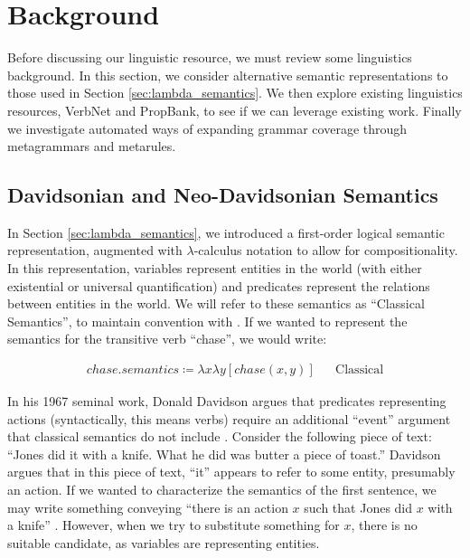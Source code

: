 \documentclass[11pt,a4paper]{article}
\begin{document}

\section{Background}

Before discussing our linguistic resource, we must review some 
linguistics background. In this section, we consider alternative semantic 
representations to those used in Section \ref{sec:lambda_semantics}. We then
explore existing linguistics resources, VerbNet and PropBank, to see if we can 
leverage existing work. Finally we investigate automated ways of expanding 
grammar coverage through metagrammars and metarules.

\subsection{Davidsonian and Neo-Davidsonian Semantics}
\label{sec:neodavidsonian}

In Section \ref{sec:lambda_semantics}, we introduced a first-order logical
semantic  representation, augmented with $\lambda$-calculus notation to allow
for compositionality. In this representation, variables represent entities in
the world  (with either existential or universal quantification) and predicates
represent the relations between entities in the world. We will refer to these
semantics as ``Classical Semantics'', to maintain convention with
\cite{neodavidsonian}. If we wanted to represent the semantics for the
transitive verb ``chase'', we would  write:

\begin{align}
chase.semantics \coloneqq \lambda x \lambda y \left[ chase(x,y) \right] && \text{Classical}
\end{align}

In his 1967 seminal work, Donald Davidson argues that predicates
representing actions (syntactically, this means verbs) require an additional
``event'' argument that classical semantics do not include
\cite{davidson1967logical}. Consider the following piece of text: ``Jones did it
with a knife. What he did was butter a piece of toast.'' Davidson argues that
in this piece of text, ``it'' appears to refer to some entity, presumably an
action. If we wanted to characterize the semantics of the first sentence, we may
write something conveying ``there is an action $x$ such that Jones did $x$ with a
knife'' \cite{davidson1967logical}. However, when we try to substitute something
for $x$, there is no suitable candidate, as variables are representing
entities.
\end{document}

